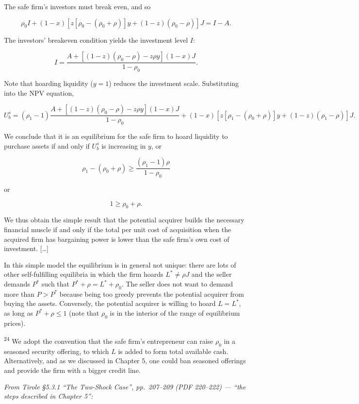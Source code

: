\documentclass[11pt,a4paper]{article}
\begin{document}
The safe firm's investors must break even, and so

\[\rho_0 I + (1 - x)[z[\rho_0 - (\rho_0 + \rho)]y + (1 - z)(\rho_0 - \rho)]J = I - A.\]

The investors' breakeven condition yields the investment level \(I\):

\[I = \frac{A + [(1 - z)(\rho_0 - \rho) - z\rho y](1 - x)J}{1 - \rho_0}.\]

Note that hoarding liquidity (\(y = 1\)) reduces the investment scale. Substituting into the NPV
equation,

\[U_b^s = (\rho_1 - 1)\frac{A + [(1 - z)(\rho_0 - \rho) - z\rho y](1 - x)J}{1 - \rho_0} + (1 - x)[z[\rho_1 - (\rho_0 + \rho)]y + (1 - z)(\rho_1 - \rho)]J.\]

We conclude that it is an equilibrium for the safe firm to hoard liquidity to purchase assets if and
only if \(U_b^s\) is increasing in \(y\), or

\[\rho_1 - (\rho_0 + \rho) \geqslant \frac{(\rho_1 - 1)\rho}{1 - \rho_0}\]

or

\[1 \geqslant \rho_0 + \rho.\]

We thus obtain the simple result that the potential acquirer builds the necessary financial muscle
if and only if the total per unit cost of acquisition when the acquired firm has bargaining power is
lower than the safe firm's own cost of investment. {[}\ldots{]}

In this simple model the equilibrium is in general not unique: there are lots of other
self-fulfilling equilibria in which the firm hoards \(L^* \neq \rho J\) and the seller demands
\(P^*\) such that \(P^* + \rho = L^* + \rho_0\). The seller does not want to demand more than
\(P > P^*\) because being too greedy prevents the potential acquirer from buying the assets.
Conversely, the potential acquirer is willing to hoard \(L = L^*\), as long as
\(P^* + \rho \leqslant 1\) (note that \(\rho_0\) is in the interior of the range of equilibrium
prices).

\textsuperscript{24} We adopt the convention that the safe firm's entrepreneur can raise \(\rho_0\)
in a seasoned security offering, to which \(L\) is added to form total available cash.
Alternatively, and as we discussed in Chapter 5, one could ban seasoned offerings and provide the
firm with a bigger credit line.

\emph{From Tirole §5.3.1 ``The Two-Shock Case'', pp.~207--209 (PDF 220--222) --- ``the steps
described in Chapter 5'':}
\end{document}
